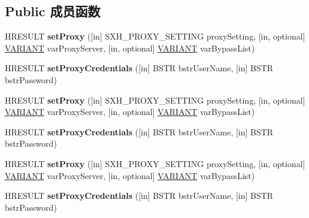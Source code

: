 \subsection*{Public 成员函数}
\begin{DoxyCompactItemize}
\item 
\mbox{\label{interface_m_s_x_m_l2_1_1_i_server_x_m_l_h_t_t_p_request2_afbefd6401c2724884d4603836a30275b}} 
H\+R\+E\+S\+U\+LT {\bfseries set\+Proxy} (\mbox{[}in\mbox{]} S\+X\+H\+\_\+\+P\+R\+O\+X\+Y\+\_\+\+S\+E\+T\+T\+I\+NG proxy\+Setting, \mbox{[}in, optional\mbox{]} \hyperlink{structtag_v_a_r_i_a_n_t}{V\+A\+R\+I\+A\+NT} var\+Proxy\+Server, \mbox{[}in, optional\mbox{]} \hyperlink{structtag_v_a_r_i_a_n_t}{V\+A\+R\+I\+A\+NT} var\+Bypass\+List)
\item 
\mbox{\label{interface_m_s_x_m_l2_1_1_i_server_x_m_l_h_t_t_p_request2_a0e5ba3af47f7ce43ccd1c63e150ff7f0}} 
H\+R\+E\+S\+U\+LT {\bfseries set\+Proxy\+Credentials} (\mbox{[}in\mbox{]} B\+S\+TR bstr\+User\+Name, \mbox{[}in\mbox{]} B\+S\+TR bstr\+Password)
\item 
\mbox{\label{interface_m_s_x_m_l2_1_1_i_server_x_m_l_h_t_t_p_request2_afbefd6401c2724884d4603836a30275b}} 
H\+R\+E\+S\+U\+LT {\bfseries set\+Proxy} (\mbox{[}in\mbox{]} S\+X\+H\+\_\+\+P\+R\+O\+X\+Y\+\_\+\+S\+E\+T\+T\+I\+NG proxy\+Setting, \mbox{[}in, optional\mbox{]} \hyperlink{structtag_v_a_r_i_a_n_t}{V\+A\+R\+I\+A\+NT} var\+Proxy\+Server, \mbox{[}in, optional\mbox{]} \hyperlink{structtag_v_a_r_i_a_n_t}{V\+A\+R\+I\+A\+NT} var\+Bypass\+List)
\item 
\mbox{\label{interface_m_s_x_m_l2_1_1_i_server_x_m_l_h_t_t_p_request2_a0e5ba3af47f7ce43ccd1c63e150ff7f0}} 
H\+R\+E\+S\+U\+LT {\bfseries set\+Proxy\+Credentials} (\mbox{[}in\mbox{]} B\+S\+TR bstr\+User\+Name, \mbox{[}in\mbox{]} B\+S\+TR bstr\+Password)
\item 
\mbox{\label{interface_m_s_x_m_l2_1_1_i_server_x_m_l_h_t_t_p_request2_afbefd6401c2724884d4603836a30275b}} 
H\+R\+E\+S\+U\+LT {\bfseries set\+Proxy} (\mbox{[}in\mbox{]} S\+X\+H\+\_\+\+P\+R\+O\+X\+Y\+\_\+\+S\+E\+T\+T\+I\+NG proxy\+Setting, \mbox{[}in, optional\mbox{]} \hyperlink{structtag_v_a_r_i_a_n_t}{V\+A\+R\+I\+A\+NT} var\+Proxy\+Server, \mbox{[}in, optional\mbox{]} \hyperlink{structtag_v_a_r_i_a_n_t}{V\+A\+R\+I\+A\+NT} var\+Bypass\+List)
\item 
\mbox{\label{interface_m_s_x_m_l2_1_1_i_server_x_m_l_h_t_t_p_request2_a0e5ba3af47f7ce43ccd1c63e150ff7f0}} 
H\+R\+E\+S\+U\+LT {\bfseries set\+Proxy\+Credentials} (\mbox{[}in\mbox{]} B\+S\+TR bstr\+User\+Name, \mbox{[}in\mbox{]} B\+S\+TR bstr\+Password)
\end{DoxyCompactItemize}
